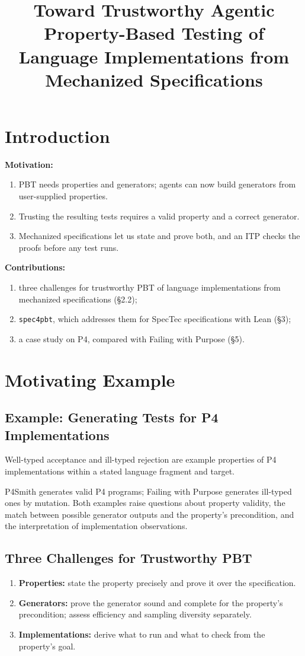 \documentclass[11pt,a4paper]{article}
\title{Toward Trustworthy Agentic Property-Based Testing of\\
  Language Implementations from Mechanized Specifications}
\date{}
\newcommand{\tool}{\texttt{spec4pbt}}
\newcommand{\desc}[1]{{\small #1\par}}
\begin{document}
\maketitle
\vspace{-3em}

\section{Introduction}
\textbf{Motivation:}
\begin{enumerate}\small
  \item PBT needs properties and generators; agents can now build generators from user-supplied properties.
  \item Trusting the resulting tests requires a valid property and a correct generator.
  \item Mechanized specifications let us state and prove both, and an ITP checks the proofs before any test runs.
\end{enumerate}
\textbf{Contributions:}
\begin{enumerate}\small
  \item three challenges for trustworthy PBT of language implementations from mechanized specifications (\S2.2);
  \item \tool{}, which addresses them for SpecTec specifications with Lean (\S3);
  \item a case study on P4, compared with Failing with Purpose (\S5).
\end{enumerate}

\section{Motivating Example}
\subsection{Example: Generating Tests for P4 Implementations}
\desc{Well-typed acceptance and ill-typed rejection are example properties of P4 implementations within a stated language fragment and target.}
\desc{P4Smith generates valid P4 programs; Failing with Purpose generates ill-typed ones by mutation. Both examples raise questions about property validity, the match between possible generator outputs and the property's precondition, and the interpretation of implementation observations.}

\subsection{Three Challenges for Trustworthy PBT}
\begin{enumerate}\small
  \item \textbf{Properties:} state the property precisely and prove it over the specification.
  \item \textbf{Generators:} prove the generator sound and complete for the property's precondition; assess efficiency and sampling diversity separately.
  \item \textbf{Implementations:} derive what to run and what to check from the property's goal.
\end{enumerate}
\end{document}

